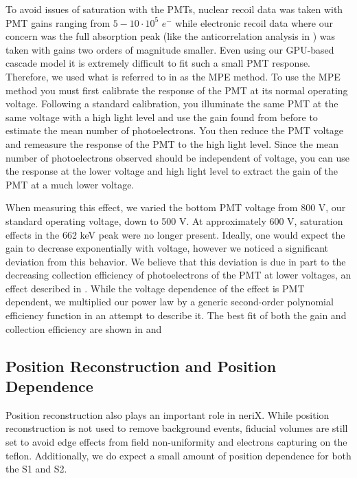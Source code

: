 To avoid issues of saturation with the PMTs, nuclear recoil data was taken with PMT gains ranging from $5-10 \cdot 10^5 \, \, e^-$ while electronic recoil data where our concern was the full absorption peak (like the anticorrelation analysis in ) was taken with gains two orders of magnitude smaller.  Even using our GPU-based cascade model it is extremely difficult to fit such a small PMT response.  Therefore, we used what is referred to in  as the MPE method.  To use the MPE method you must first calibrate the response of the PMT at its normal operating voltage.  Following a standard calibration, you illuminate the same PMT at the same voltage with a high light level and use the gain found from before to estimate the mean number of photoelectrons.  You then reduce the PMT voltage and remeasure the response of the PMT to the high light level.  Since the mean number of photoelectrons observed should be independent of voltage, you can use the response at the lower voltage and high light level to extract the gain of the PMT at a much lower voltage.

When measuring this effect, we varied the bottom PMT voltage from 800 V, our standard operating voltage, down to 500 V.  At approximately 600 V, saturation effects in the 662 keV peak were no longer present.  Ideally, one would expect the gain to decrease exponentially with voltage, however we noticed a significant deviation from this behavior.  We believe that this deviation is due in part to the decreasing collection efficiency of photoelectrons of the PMT at lower voltages, an effect described in .  While the voltage dependence of the effect is PMT dependent, we multiplied our power law by a generic second-order polynomial efficiency function in an attempt to describe it.  The best fit of both the gain and collection efficiency are shown in \figref{} and \figref{}


\subsection{Position Reconstruction and Position Dependence}

Position reconstruction also plays an important role in neriX.  While position reconstruction is not used to remove background events, fiducial volumes are still set to avoid edge effects from field non-uniformity and electrons capturing on the teflon.  Additionally, we do expect a small amount of position dependence for both the S1 and S2.  

